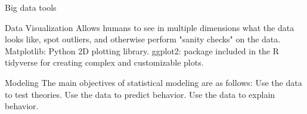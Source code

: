 \documentclass[12pt]{article}
\begin{document}
\begin{section}{Big data tools}
\begin{subsection}{Data Visualization}
Allows humans to see in multiple dimensions what the data looks like, spot outliers, and otherwise perform "sanity checks" on the data. \newline
Matplotlib: Python 2D plotting library. \newline
ggplot2: package included in the R tidyverse for creating complex and customizable plots.
\end{subsection}

\begin{subsection}{Modeling}
The main objectives of statistical modeling are as follows: \newline
Use the data to test theories. \newline
Use the data to predict behavior. \newline
Use the data to explain behavior. 
\end{subsection}

\end{section}


 
\end{document}
